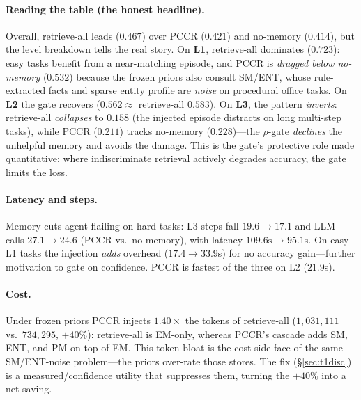 \documentclass[10pt,twocolumn]{article}
\begin{document}
\paragraph{Reading the table (the honest headline).} Overall, retrieve-all leads
($0.467$) over PCCR ($0.421$) and no-memory ($0.414$), but the level breakdown tells the
real story. On \textbf{L1}, retrieve-all dominates ($0.723$): easy tasks benefit from a
near-matching episode, and PCCR is \emph{dragged below no-memory} ($0.532$) because the
frozen priors also consult SM/ENT, whose rule-extracted facts and sparse entity profile
are \emph{noise} on procedural office tasks. On \textbf{L2} the gate recovers
($0.562 \approx$ retrieve-all $0.583$). On \textbf{L3}, the pattern \emph{inverts}:
retrieve-all \emph{collapses} to $0.158$ (the injected episode distracts on long
multi-step tasks), while PCCR ($0.211$) tracks no-memory ($0.228$)---the $\rho$-gate
\emph{declines} the unhelpful memory and avoids the damage. This is the gate's protective
role made quantitative: where indiscriminate retrieval actively degrades accuracy, the
gate limits the loss.

\paragraph{Latency and steps.} Memory cuts agent flailing on hard tasks: L3 steps fall
$19.6 \to 17.1$ and LLM calls $27.1 \to 24.6$ (PCCR vs.\ no-memory), with latency
$109.6\text{s} \to 95.1$s. On easy L1 tasks the injection \emph{adds} overhead
($17.4 \to 33.9$s) for no accuracy gain---further motivation to gate on confidence. PCCR
is fastest of the three on L2 ($21.9$s).

\paragraph{Cost.} Under frozen priors PCCR injects \textbf{$1.40\times$} the tokens of
retrieve-all ($1{,}031{,}111$ vs.\ $734{,}295$, $+40\%$): retrieve-all is EM-only, whereas
PCCR's cascade adds SM, ENT, and PM on top of EM. This token bloat is the cost-side face
of the same SM/ENT-noise problem---the priors over-rate those stores. The fix
(\S\ref{sec:t1disc}) is a measured/confidence utility that suppresses them, turning the
$+40\%$ into a net saving.
\end{document}
